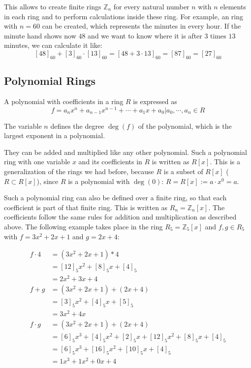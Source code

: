 This allows to create finite rings $\mathbb{Z}_n$ for every natural number $n$ with $n$ elements in each ring and to perform calculations inside these ring. For example, an ring with $n=60$ can be created, which represents the minutes in every hour. If the minute hand shows now $48$ and we want to know where it is after $3$ times $13$ minutes, we can calculate it like:
$$[48]_{60} + [3]_{60}\cdot [13]_{60} = [48+3\cdot 13]_{60} = [87]_{60} = [27]_{60}$$

\subsection*{Polynomial Rings}

A polynomial with coefficients in a ring $R$ is expressed as 
$$f = a_nx^n + a_{n-1}x^{n-1}+\cdots+a_1x+a_0 | a_0, \cdots, a_n \in R$$

The variable $n$ defines the degree $\deg(f)$ of the polynomial, which is the largest exponent in a polynomial.

They can be added and multiplied like any other polynomial. Such a polynomial ring with one variable $x$ and its coefficients in $R$ is written as $R[x]$. This is a generalization of the rings we had before, because $R$ is a subset of $R[x]$ ($R \subset R[x]$), since $R$ is a polynomial with $\deg(0)$: $R = R[x] := a\cdot x^0 = a$.

Such a polynomial ring can also be defined over a finite ring, so that each coefficient is part of that finite ring. This is written as $R_n = \mathbb{Z}_n[x]$. The coefficients follow the same rules for addition and multiplication as described above. The following example takes place in the ring $R_5 = \mathbb{Z}_5[x]$ and $f, g \in R_5$ with $f=3x^2+2x+1$ and $g=2x+4$:

\begin{align*}
  f\cdot 4 &= (3x^2+2x+1) * 4 \\
      &= [12]_5x^2+[8]_5x+[4]_5 \\
      &= 2x^2+3x+4 \\
  f+g &= (3x^2+2x+1)+(2x+4) \\
      &= [3]_5x^2+[4]_5x+[5]_5\\
      &= 3x^2+4x \\
  f\cdot g &= (3x^2+2x+1)+(2x+4) \\ 
      &= [6]_5x^3+[4]_5x^2+[2]_5x+[12]_5x^2+[8]_5x+[4]_5 \\
      &= [6]_5x^3+[16]_5x^2+[10]_5x+[4]_5 \\
      &= 1x^3+1x^2+0x+4 \\
\end{align*}

